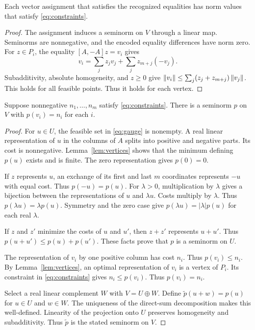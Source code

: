 \begin{lemma}[Necessity]\label{lem:necessary}
Each vector assignment that satisfies the recognized equalities has norm values that satisfy \eqref{eq:constraints}.
\end{lemma}
\begin{proof}
The assignment induces a seminorm on $V$ through a linear map.
Seminorms are nonnegative, and the encoded equality differences have norm zero.
For $z\in P_i$, the equality $[A,-A]z=v_i$ gives
\[
 v_i=\sum_j z_jv_j+\sum_j z_{m+j}(-v_j).
\]
Subadditivity, absolute homogeneity, and $z\ge0$ give
$\left\lVert v_i\right\rVert\le\sum_j(z_j+z_{m+j})\left\lVert v_j\right\rVert$.
This holds for all feasible points.
Thus it holds for each vertex.
\end{proof}

\begin{lemma}[Realization]\label{lem:realization}
Suppose nonnegative $n_1,\ldots,n_m$ satisfy \eqref{eq:constraints}.
There is a seminorm $p$ on $V$ with $p(v_i)=n_i$ for each $i$.
\end{lemma}
\begin{proof}
For $u\in U$, the feasible set in \eqref{eq:gauge} is nonempty.
A real linear representation of $u$ in the columns of $A$ splits into positive and negative parts.
Its cost is nonnegative.
Lemma~\ref{lem:vertices} shows that the minimum defining $p(u)$ exists and is finite.
The zero representation gives $p(0)=0$.

If $z$ represents $u$, an exchange of its first and last $m$ coordinates represents $-u$ with equal cost.
Thus $p(-u)=p(u)$.
For $\lambda>0$, multiplication by $\lambda$ gives a bijection between the representations of $u$ and $\lambda u$.
Costs multiply by $\lambda$.
Thus $p(\lambda u)=\lambda p(u)$.
Symmetry and the zero case give $p(\lambda u)=|\lambda|p(u)$ for each real $\lambda$.

If $z$ and $z'$ minimize the costs of $u$ and $u'$, then $z+z'$ represents $u+u'$.
Thus $p(u+u')\le p(u)+p(u')$.
These facts prove that $p$ is a seminorm on $U$.

The representation of $v_i$ by one positive column has cost $n_i$.
Thus $p(v_i)\le n_i$.
By Lemma~\ref{lem:vertices}, an optimal representation of $v_i$ is a vertex of $P_i$.
Its constraint in \eqref{eq:constraints} gives $n_i\le p(v_i)$.
Thus $p(v_i)=n_i$.

Select a real linear complement $W$ with $V=U\oplus W$.
Define $\widetilde p(u+w)=p(u)$ for $u\in U$ and $w\in W$.
The uniqueness of the direct-sum decomposition makes this well-defined.
Linearity of the projection onto $U$ preserves homogeneity and subadditivity.
Thus $\widetilde p$ is the stated seminorm on $V$.
\end{proof}

